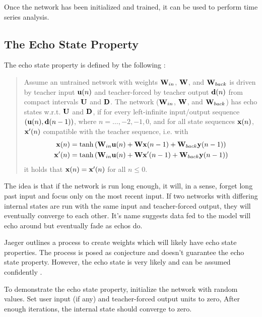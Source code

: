 \documentclass{article}
\begin{document}
Once the network has been initialized and trained, it can be used to 
perform time series analysis.

\subsection{The Echo State Property}
\label{sec:eprop}

The echo state property is defined by the following \cite{jaeger2002tutorial}:

\begin{quote}
    Assume an untrained network with weights $\mathbf{W}_{in}$, $\mathbf{W}$, and $\mathbf{W}_{back}$ is 
    driven by teacher input $\mathbf{u}(n)$ and teacher-forced by teacher output 
    $\mathbf{d}(n)$ from compact intervals $\mathbf{U}$ and $\mathbf{D}$. The network ($\mathbf{W}_{in}$, 
    $\mathbf{W}$, and $\mathbf{W}_{back}$) has echo states w.r.t. $\mathbf{U}$ and $\mathbf{D}$, if for 
    every left-infinite input/output sequence $(\mathbf{u}(n), \mathbf{d}(n-1))$, where 
    $n=\dots, -2, -1, 0$, and for all state sequences $\mathbf{x}(n)$,
    $\mathbf{x}'(n)$ compatible with the teacher sequence, i.e. with
    \begin{align}
        \mathbf{x}(n) &= \tanh \left(
                \mathbf{W}_{in} \mathbf{u}(n)
                + \mathbf{W} \mathbf{x}(n-1)
                + \mathbf{W}_{back} \mathbf{y}(n-1)
            \right) \\
        \mathbf{x}'(n) &= \tanh \left(
                \mathbf{W}_{in} \mathbf{u}(n)
                + \mathbf{W} \mathbf{x}'(n-1)
                + \mathbf{W}_{back} \mathbf{y}(n-1)
            \right)
    \end{align}
    it holds that $\mathbf{x}(n) = \mathbf{x}'(n)$ for all $n \leq 0$.
\end{quote}

The idea is that if the network is run long enough, it will, in a sense, 
forget long past input and focus only on the most recent input. If two 
networks with differing internal states are run with the same input and 
teacher-forced output, they will eventually converge to each other.
It's name suggests data fed to the model will echo around but eventually 
fade as echos do.

Jaeger outlines a process to create weights which will likely have
echo state properties. The process is posed as conjecture and 
doesn't guarantee the echo state property. However, the echo state is very 
likely and can be
assumed confidently \cite{jaeger2002tutorial} \cite{jaeger2007echo}.

To demonstrate the echo state property, initialize the network with random 
values. Set user input (if any) and teacher-forced output units to zero,
After enough iterations, the internal state should converge to zero.
\end{document}
